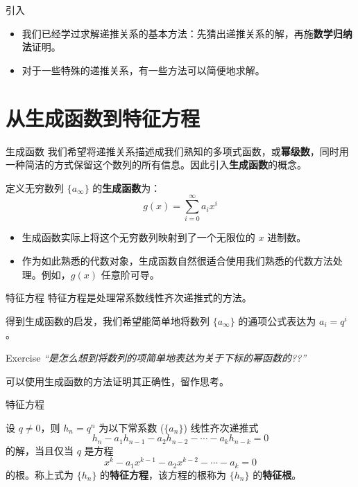 \documentclass{beamer}
\begin{document}
\begin{frame}{引入}
    \begin{itemize}
        \item 我们已经学过求解递推关系的基本方法：先猜出递推关系的解，再施\textbf{数学归纳法}证明。
        \pause
        \item 对于一些特殊的递推关系，有一些方法可以简便地求解。
    \end{itemize}
\end{frame}

\section{从生成函数到特征方程}

\begin{frame}{生成函数}
    我们希望将递推关系描述成我们熟知的多项式函数，或\textbf{幂级数}，同时用一种简洁的方式保留这个数列的所有信息。因此引入\textbf{生成函数}的概念。
    \begin{definition}
        定义无穷数列 $\{a_\infty\}$ 的\textbf{生成函数}为：
        $$
            g(x) = \sum_{i=0}^\infty a_ix^i
        $$
    \end{definition}
    \pause
    \begin{itemize}
        \item 生成函数实际上将这个无穷数列映射到了一个无限位的 $x$ 进制数。
        \pause
        \item 作为如此熟悉的代数对象，生成函数自然很适合使用我们熟悉的代数方法处理。例如，$g(x)$ 任意阶可导。
    \end{itemize}
\end{frame}

\begin{frame}{特征方程}
    特征方程是处理常系数线性齐次递推式的方法。

    得到生成函数的启发，我们希望能简单地将数列 $\{a_\infty\}$ 的通项公式表达为 $a_i = q^i$。
    \pause
    \begin{block}{Exercise}
        \textit{``是怎么想到将数列的项简单地表达为关于下标的幂函数的??''}

        可以使用生成函数的方法证明其正确性，留作思考。
    \end{block}
\end{frame}

\begin{frame}{特征方程}
    \begin{theorem}[特征方程与特征根]
        设 $q \ne 0$，则 $h_n = q^n$ 为以下常系数 ($\{a_n\}$) 线性齐次递推式
        $$
            h_n - a_1h_{n-1} - a_2h_{n-2} - \cdots - a_kh_{n-k} = 0 
        $$
        的解，当且仅当 $q$ 是方程
        $$
            x^k - a_1x^{k-1}-a_2x^{k-2}-\cdots-a_k = 0
        $$
        的根。称上式为 $\{h_n\}$ 的\textbf{特征方程}，该方程的根称为 $\{h_n\}$ 的\textbf{特征根}。
    \end{theorem}
\end{frame}
\end{document}
